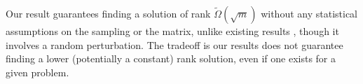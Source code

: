 Our result guarantees finding a solution of rank $\tilde{\Omega}(\sqrt{m})$ without any statistical assumptions on the sampling or the matrix, unlike existing results \citep{ge2016matrix}, though it involves a random perturbation. The tradeoff is our results does not guarantee finding a lower (potentially a constant) rank solution, even if one exists for a given problem. 


%
%
%
%
%
%
